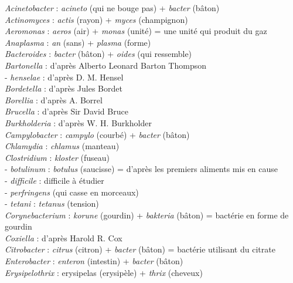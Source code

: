 \emph{Acinetobacter} : \emph{acineto} (qui ne bouge pas) + \emph{bacter}
(bâton)\\
\emph{Actinomyces} : \emph{actis} (rayon) + \emph{myces} (champignon)\\
\emph{Aeromonas} : \emph{aeros} (air) + \emph{monas} (unité) = une unité
qui produit du gaz\\
\emph{Anaplasma} : \emph{an} (sans) + \emph{plasma} (forme)\\
\emph{Bacteroides} : \emph{bacter} (bâton) + \emph{oides} (qui
ressemble)\\
\emph{Bartonella} : d'après Alberto Leonard Barton Thompson\\
\hspace*{0.333em} - \emph{henselae} : d'après D. M. Hensel\\
\emph{Bordetella} : d'après Jules Bordet\\
\emph{Borellia} : d'après A. Borrel\\
\emph{Brucella} : d'après Sir David Bruce\\
\emph{Burkholderia} : d'après W. H. Burkholder\\
\emph{Campylobacter} : \emph{campylo} (courbé) + \emph{bacter} (bâton)\\
\emph{Chlamydia} : \emph{chlamus} (manteau)\\
\emph{Clostridium} : \emph{kloster} (fuseau)\\
\hspace*{0.333em} - \emph{botulinum} : \emph{botulus} (saucisse) =
d'après les premiers aliments mis en cause\\
\hspace*{0.333em} - \emph{difficile} : difficile à étudier\\
\hspace*{0.333em} - \emph{perfringens} (qui casse en morceaux)\\
\hspace*{0.333em} - \emph{tetani} : \emph{tetanus} (tension)\\
\emph{Corynebacterium} : \emph{korune} (gourdin) + \emph{bakteria}
(bâton) = bactérie en forme de gourdin\\
\emph{Coxiella} : d'après Harold R. Cox\\
\emph{Citrobacter} : \emph{citrus} (citron) + \emph{bacter} (bâton) =
bactérie utilisant du citrate\\
\emph{Enterobacter} : \emph{enteron} (intestin) + \emph{bacter}
(bâton)\\
\emph{Erysipelothrix} : erysipelas (erysipèle) + \emph{thrix} (cheveux)
